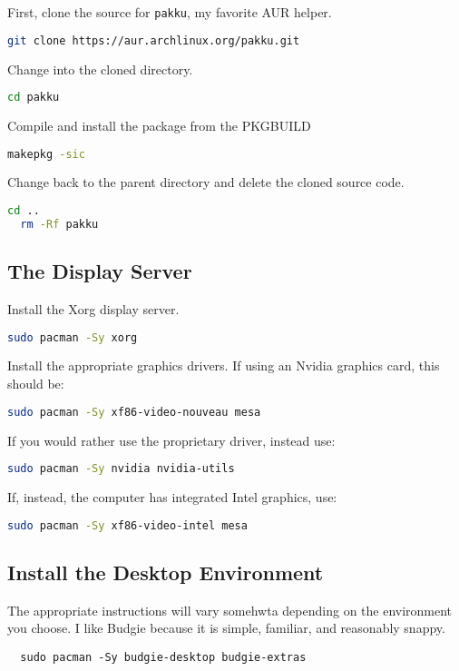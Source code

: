 \documentclass[letterpaper,12pt]{article}
\newcommand{\p}{\par\bigskip}
\begin{document}
First, clone the source for {\tt pakku}, my favorite AUR helper.
\begin{lstlisting}[language=bash]
  git clone https://aur.archlinux.org/pakku.git
\end{lstlisting} \p

Change into the cloned directory.
\begin{lstlisting}[language=bash]
  cd pakku
\end{lstlisting} \p

Compile and install the package from the PKGBUILD
\begin{lstlisting}[language=bash]
  makepkg -sic
\end{lstlisting} \p

Change back to the parent directory and delete the cloned source code.
\begin{lstlisting}[language=bash]
  cd ..
  rm -Rf pakku
\end{lstlisting}


\subsection{The Display Server}
Install the Xorg display server.
\begin{lstlisting}[language=bash]
  sudo pacman -Sy xorg
\end{lstlisting} \p

Install the appropriate graphics drivers. If using an Nvidia graphics card, this should be:
\begin{lstlisting}[language=bash]
  sudo pacman -Sy xf86-video-nouveau mesa
\end{lstlisting} \p

If you would rather use the proprietary driver, instead use:
\begin{lstlisting}[language=bash]
  sudo pacman -Sy nvidia nvidia-utils
\end{lstlisting} \p

If, instead, the computer has integrated Intel graphics, use:
\begin{lstlisting}[language=bash]
  sudo pacman -Sy xf86-video-intel mesa
\end{lstlisting}


\subsection{Install the Desktop Environment}
The appropriate instructions will vary somehwta depending on the environment you choose. I like Budgie because it is simple, familiar, and reasonably snappy.
\begin{lstlisting}
  sudo pacman -Sy budgie-desktop budgie-extras
\end{lstlisting} \p
\end{document}

